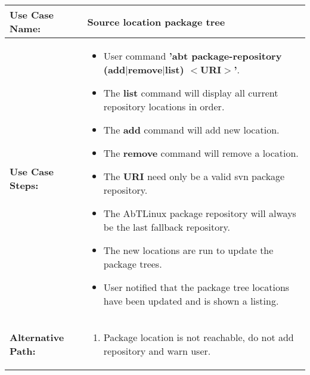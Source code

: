 \medskip

\begin{tabularx}{\linewidth}{|l|X|}
\hline
\textbf{Use Case Name:} & \textbf{Source location package tree} \\
\hline
\textbf{Use Case Steps:} & 
\begin{minipage}{\linewidth} 
  \vspace{0.05em}
  \begin{itemize}
    \item User command \textbf{'abt package-repository (add$|$remove$|$list) $<$URI$>$'}.
    \item The \textbf{list} command will display all current repository locations in order.
    \item The \textbf{add} command will add new location.
    \item The \textbf{remove} command will remove a location.
    \item The \textbf{URI} need only be a valid svn package repository.
    \item The AbTLinux package repository will always be the last fallback repository.
    \item The new locations are run to update the package trees.
    \item User notified that the package tree locations have been updated and is shown a listing.
  \end{itemize}
  \vspace{0.05em}
\end{minipage}
\\
\hline 
\textbf{Alternative Path:} &
\begin{minipage}{\linewidth}
  \vspace{0.05em} 
  \begin{enumerate}
    \item Package location is not reachable, do not add repository and warn user.
  \end{enumerate}
  \vspace{0.05em} 
\end{minipage}
\\
\hline
\end{tabularx}

\newpage